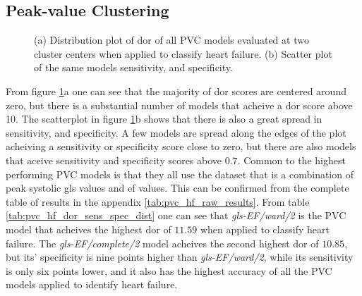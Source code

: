 \newpage

\subsection{Peak-value Clustering}

\begin{figure}[htb]
    \centering
    
    \caption{(a) Distribution plot of \acrshort{dor} of all PVC models evaluated at two cluster centers when applied to classify heart failure.
             (b) Scatter plot of the same models sensitivity, and specificity.}
    \label{fig:pvc_hf_dor_sens_spec_dist}
\end{figure}

From figure \ref{fig:pvc_hf_dor_sens_spec_dist}a one can see that the majority of \acrshort{dor} scores are centered around zero, but there is a substantial number of models that acheive a \acrshort{dor} score above 10. The scatterplot in figure \ref{fig:pvc_hf_dor_sens_spec_dist}b shows that there is also a great spread in sensitivity, and specificity. A few models are spread along the edges of the plot acheiving a sensitivity or specificity score close to zero, but there are also models that aceive sensitivity and specificity scores above $0.7$. Common to the highest performing PVC models is that they all use the dataset that is a combination of peak systolic \acrshort{gls} values and \acrshort{ef} values. This can be confirmed from the complete table of results in the appendix \ref{tab:pvc_hf_raw_results}. From table \ref{tab:pvc_hf_dor_sens_spec_dist} one can see that \textit{gls-EF/ward/2} is the PVC model that acheives the highest \acrshort{dor} of $11.59$ when applied to classify heart failure. The \textit{gls-EF/complete/2} model acheives the second highest \acrshort{dor} of $10.85$, but its' specificity is nine points higher than \textit{gls-EF/ward/2}, while its sensitivity is only six points lower, and it also has the highest accuracy of all the PVC models applied to identify heart failure. \bigskip

